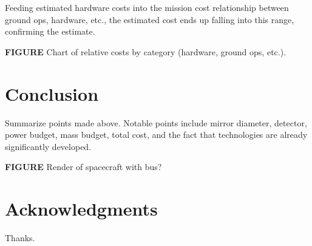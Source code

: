 \documentclass{ws-jai}
\begin{document}
Feeding estimated hardware costs into the mission cost relationship between ground ops, hardware, etc., the estimated cost ends up falling into this range, confirming the estimate.

\textbf{FIGURE} Chart of relative costs by category (hardware, ground ops, etc.).

\section{Conclusion}
\label{S:conclusion}
Summarize points made above. Notable points include mirror diameter, detector, power budget, mass budget, total cost, and the fact that technologies are already significantly developed.

\textbf{FIGURE} Render of spacecraft with bus?

\section*{Acknowledgments}
Thanks.


\end{document}

